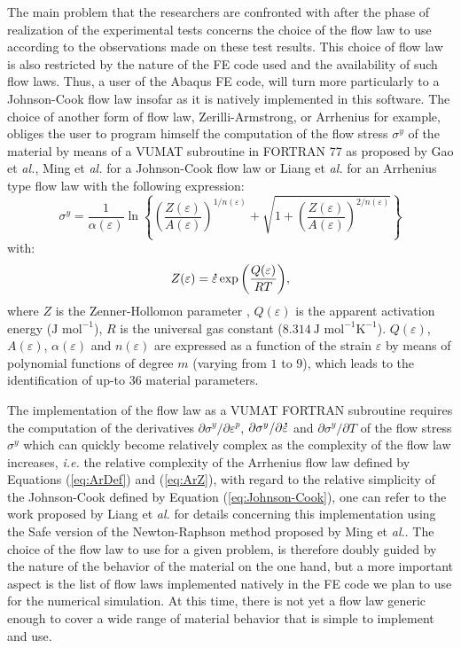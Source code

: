 \documentclass[algorithms,article,submit,pdftex,moreauthors]{Definitions/mdpi}
\makeatletter
\DeclareRobustCommand{\mdot}[1]{\accentset{\mbox{\bfseries .}}{#1}}
\DeclareRobustCommand{\ie}{\emph{i.e.}\@\xspace}
\DeclareRobustCommand{\eal}{et \emph{al.}\@\xspace}
\makeatother
\begin{document}
The main problem that the researchers are confronted with after the phase of realization of the experimental tests concerns the choice of the flow law to use according to the observations made on these test results.
This choice of flow law is also restricted by the nature of the FE code used and the availability of such flow laws.
Thus, a user of the Abaqus FE code, will turn more particularly to a Johnson-Cook \cite{Johnson-1983} flow law insofar as it is natively implemented in this software.
The choice of another form of flow law, Zerilli-Armstrong, or Arrhenius for example, obliges the user to program himself the computation of the flow stress $\sigma^y$ of the material by means of a VUMAT subroutine in FORTRAN 77 as proposed by Gao \eal \cite{Gao-2007-FRT}, Ming \eal \cite{Ming-2018} for a Johnson-Cook flow law or Liang \eal \cite{Liang-2022} for an Arrhenius type flow law with the following expression:
\begin{equation}
\sigma^y = \frac{1}{\alpha(\varepsilon)} \ln\left\{\left(\frac{Z(\varepsilon)}{A(\varepsilon)}\right)^{1/n(\varepsilon)} + \sqrt{1 + \left(\frac{Z(\varepsilon)}{A(\varepsilon)}\right)^{2/n(\varepsilon)}}\right\}
\label{eq:ArDef}
\end{equation}
with:
\begin{equation}
Z(\varepsilon) = \mdot\varepsilon \exp{\left(\frac{Q(\varepsilon)}{RT}\right)}, \label{eq:ArZ}
\end{equation}
where $Z$ is the Zenner-Hollomon parameter \cite{Zener-1944}, $Q(\varepsilon)$ is the apparent activation energy ($\text{J~mol}^{-1}$), $R$ is the universal gas constant ($8.314~\text{J~mol}^{-1} \text{K}^{-1}$).
$Q(\varepsilon)$, $A(\varepsilon)$, $\alpha(\varepsilon)$ and $n(\varepsilon)$ are expressed as a function of the strain $\varepsilon$ by means of polynomial functions of degree $m$ (varying from $1$ to $9$), which leads to the identification of up-to $36$ material parameters.

The implementation of the flow law as a VUMAT FORTRAN subroutine requires the computation of the derivatives  $\partial\sigma^y/\partial\varepsilon^p$, $\partial\sigma^y/\partial\mdot\varepsilon$ and $\partial\sigma^y/\partial T$ of the flow stress $\sigma^y$ which can quickly become relatively complex as the complexity of the flow law increases, \ie the relative complexity of the Arrhenius flow law defined by Equations (\ref{eq:ArDef}) and (\ref{eq:ArZ}), with regard to the relative simplicity of the Johnson-Cook defined by Equation (\ref{eq:Johnson-Cook}), one can refer to the work proposed by Liang \eal \cite{Liang-2022} for details concerning this implementation using the Safe version of the Newton-Raphson method proposed by Ming \eal \cite{Ming-2018}.
The choice of the flow law to use for a given problem, is therefore doubly guided by the nature of the behavior of the material on the one hand, but a more important aspect is the list of flow laws implemented natively in the FE code we plan to use for the numerical simulation.
At this time, there is not yet a flow law generic enough to cover a wide range of material behavior that is simple to implement and use.
\end{document}
